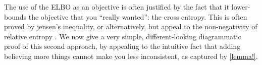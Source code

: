 \documentclass{article}
\makeatletter
\theoremstyle{plain}
\newtheorem{prop}[theorem]{Proposition}
\theoremstyle{definition}
\let\H\relax
\DeclareMathOperator{\H}{\mathrm{H}} %
\DeclareMathOperator*{\Ex}{\mathbb{E}} %
\newcommand{\datadist}[1]{\Pr\nolimits_{#1}}
\newcommand\aar{\@ifstar\aar@resize\aar@plain}
\newcommand\aar@resize[1]{\scaleleftright[3.8ex]{\Biggl\langle\!\!\!\!\Biggl\langle}{#1}
		{\Biggr\rangle\!\!\!\!\Biggr\rangle}}
\makeatother
\begin{document}
%
%
%
%
%



The use of the ELBO as an objective is often justified by the fact that it lower-bounds the objective that you ``really wanted'': the cross entropy.
This is often proved by jensen's inequality, or alternatively, but appeal to the non-negativity of relative entropy \cite{elboproofs}.
We now give a very simple, different-looking diagrammatic proof of this second approach, by appealing to the intuitive fact that adding believing more things cannot make you less inconsistent, as captured by \cref{lemma!}.
\end{document}
